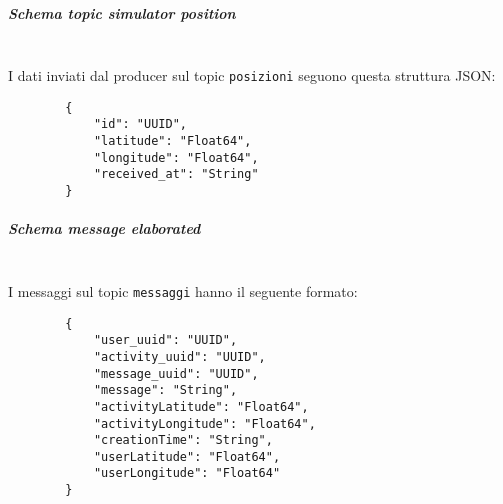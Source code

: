 \documentclass[10pt]{article}
\newcommand{\mysubparagraph}[1]{\subparagraph{#1}\mbox{}\\}
\begin{document}
        \mysubparagraph{Schema topic simulator position}
        I dati inviati dal producer sul topic \texttt{posizioni} seguono questa struttura JSON: \\
        \begin{lstlisting}
        {
            "id": "UUID",
            "latitude": "Float64",
            "longitude": "Float64",
            "received_at": "String"
        }
        \end{lstlisting}

        \mysubparagraph{Schema message elaborated}
        I messaggi sul topic \texttt{messaggi} hanno il seguente formato: \\
        \begin{lstlisting}
        {
            "user_uuid": "UUID",
            "activity_uuid": "UUID",
            "message_uuid": "UUID",
            "message": "String",
            "activityLatitude": "Float64",
            "activityLongitude": "Float64",
            "creationTime": "String",
            "userLatitude": "Float64",
            "userLongitude": "Float64"
        }
        \end{lstlisting}
\end{document}
